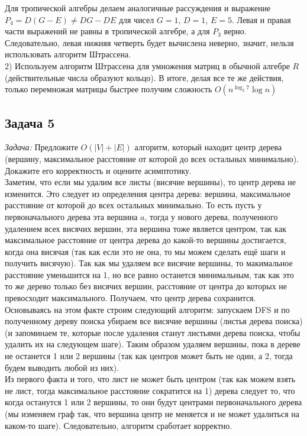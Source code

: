 \documentclass[a4paper,12pt]{article} %
\begin{document}
Для тропической алгебры делаем аналогичные рассуждения и выражение $ P_4 = D(G-E) \neq DG - DE $ для чисел $ G=1 $, $ D = 1 $, $ E = 5 $. Левая и правая части выражений не равны в тропической алгебре, а для $ P_3 $ верно. Следовательно, левая нижняя четверть будет вычислена неверно, значит, нельзя использовать алгоритм Штрассена.\\

2) Используем алгоритм Штрассена для умножения матриц в обычной алгебре $ R $ (действительные числа образуют кольцо). В итоге, делая все те же действия, только перемножая матрицы быстрее получим сложность $ O(n^{\log_2 7} \log n) $

\subsection*{Задача 5}
\textit{Задача:} Предложите $O(|V|+|E|)$ алгоритм, который находит центр дерева (вершину, максимальное расстояние от которой до всех остальных минимально). Докажите его корректность и оцените асимптотику.\\

Заметим, что если мы удалим все листы (висячие вершины), то центр дерева не изменится. Это следует из определения центра дерева: вершина, максимальное расстояние от которой до всех остальных минимально. То есть пусть у первоначального дерева эта вершина $ a $, тогда у нового дерева, полученного удалением всех висячих вершин, эта вершина тоже является центром, так как максимальное расстояние от центра дерева до какой-то вершины достигается, когда она висячая (так как если это не она, то мы можем сделать ещё шаги и получить висячую). Так как мы удаляем все висячие вершины, то макимальное расстояние уменьшится на 1, но все равно останется минимальным, так как это то же дерево только без висячих вершин, расстояние от центра до которых не превосходит максимального. Получаем, что центр дерева сохранится.\\

Основываясь на этом факте строим следующий алгоритм: запускаем DFS и по полученному дереву поиска убираем все висячие вершины (листья дерева поиска) (и запоминаем те, которые после удаления станут листьями дерева поиска, чтобы удалить их на следующем шаге). Таким образом удаляем вершины, пока в дереве не останется 1 или 2 вершины (так как центров может быть не один, а 2, тогда будем выводить любой из них).\\

Из первого факта и того, что лист не может быть центром (так как можем взять не лист, тогда максимальное расстояние сократится на 1) дерева следует то, что когда останутся 1 или 2 вершины, то они будут центрами первоначального дерева (мы изменяем граф так, что вершина центр не меняется и не может удалиться на каком-то шаге). Следовательно, алгоритм сработает корректно.\\
\end{document}
